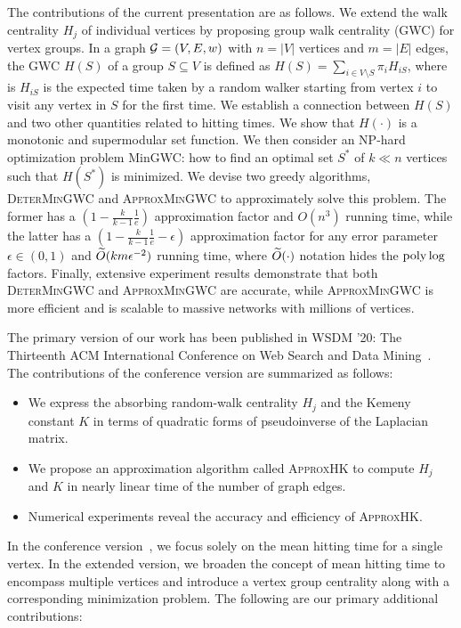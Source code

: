 \documentclass[10pt,twocolumn,twoside]{IEEEtran}
\begin{document}
The contributions of the current presentation are as follows. We extend the walk centrality  $H_j$ of individual vertices by proposing group walk centrality (GWC) for vertex groups.   In a graph \(\mathcal{G}=(V,E,w)\) with $n=|V|$ vertices and $m=|E|$ edges,  the GWC $H(S)$ of a group $S \subseteq V$  is defined as  $H(S) =\sum_{i \in V \setminus S} \pi_i H_{iS}$, where is $H_{iS}$ is the expected time taken by a random walker starting from vertex $i$ to visit any vertex in \(S\) for the first time. We establish a connection between  $H(S)$ and two other quantities related to hitting times.  We show that $H(\cdot)$ is a monotonic and supermodular set function. We then consider an NP-hard optimization problem MinGWC: how to find an optimal set $S^*$ of $k \ll n$ vertices such that $H(S^*)$ is minimized.  We devise two greedy algorithms,  \textsc{DeterMinGWC} and \textsc{ApproxMinGWC} to approximately solve this problem. The former has a $(1-\frac{k}{k-1} \frac{1}{e})$  approximation factor and $O(n^3)$ running time, while the latter has a $(1-\frac{k}{k-1} \frac{1}{e}-\epsilon)$ approximation factor for any error parameter \(\epsilon\in(0,1)\) and $\widetilde{O} (km \epsilon^{-2})$ running time, where $\widetilde{O} (\cdot)$ notation hides the ${\rm poly}\log $ factors. Finally, extensive experiment results demonstrate that both \textsc{DeterMinGWC} and \textsc{ApproxMinGWC}  are accurate, while \textsc{ApproxMinGWC} is more efficient and is scalable to massive networks with millions of vertices.




\iffalse
    The primary version of our work has been published in WSDM '20: The Thirteenth ACM International Conference on Web Search and Data Mining~\cite{ZhXuZh20}. The contributions of the conference version are summarized as follows:

    \begin{itemize}
        \item We express the absorbing random-walk centrality \(H_j\) and the Kemeny constant \(K\) in terms of quadratic forms of pseudoinverse of the Laplacian matrix.
        \item We propose an approximation algorithm called \textsc{ApproxHK} to compute \(H_j\) and \(K\) in nearly linear time of the number of graph edges.
        \item Numerical experiments reveal the accuracy and efficiency of \textsc{ApproxHK}.
    \end{itemize}

    In the conference version~\cite{ZhXuZh20}, we focus solely on the mean hitting time for a single vertex.
    In the extended version, we broaden the concept of mean hitting time to encompass multiple vertices and introduce a vertex group centrality along with a corresponding minimization problem.
    The following are our primary additional contributions:
\end{document}
